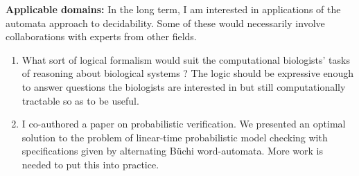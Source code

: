 \documentclass[12pt]{article}
\theoremstyle{plain} \numberwithin{equation}{section}
\theoremstyle{definition}
\begin{document}


{\bf Applicable domains:} In the long term, I am interested in applications of the automata approach to decidability. Some of these would necessarily involve collaborations with experts from other fields.
\begin{enumerate}
\item
What sort of logical formalism would suit the computational biologists' tasks of reasoning about biological systems \cite{Hare04, FiHe06}? The logic should be expressive enough to answer questions the biologists are interested in but still computationally tractable so as to be useful.

\item I co-authored a paper \cite{BRV04} on probabilistic verification. We presented an optimal solution to the problem of linear-time probabilistic model checking with specifications given by alternating B\"uchi word-automata. More work is needed to put this into practice.
\end{enumerate}


\end{document}

